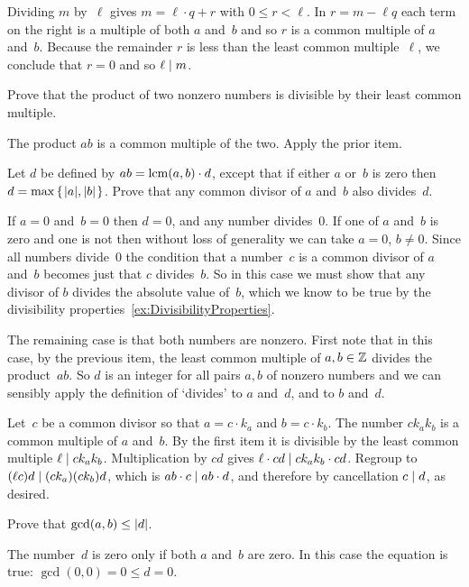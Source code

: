 \documentclass{test}  %
\begin{document}
\begin{euclidproof}
\begin{problem}
\begin{exes}
\begin{answer}
  Dividing $m$ by~$\ell$ gives 
  $m=\ell\cdot q+r$ with $0\leq r< \ell$.
  In $r=m-\ell q$ 
  each term on the right is a multiple
  of both $a$ and~$b$ and so 
  $r$ is a common multiple of $a$ and~$b$.
  Because the remainder $r$ is less than the least common multiple~$\ell$,
  we conclude that $r=0$ and so $\ell\mid m$.  
\end{answer}
\begin{exercise} 
  Prove that the product of two nonzero numbers is divisible by their 
  least common multiple.
\end{exercise}
\begin{answer}
  The product $ab$ is a common multiple of the two.
  Apply the prior item.
\end{answer}
\begin{exercise} 
  Let $d$ be defined by 
  $ab=\operatorname{lcm}(a,b)\cdot d$, except that if either $a$ or~$b$ is zero
  then $d=\max\mbox{$\{\hspace{0.1em}\lvert a\rvert,\lvert b\rvert\hspace{0.1em}\}$}$.
  Prove that any common divisor of $a$ and~$b$ also divides~$d$.
\end{exercise}
\begin{answer}
  If $a=0$ and~$b=0$ then $d=0$, and any number divides~$0$.
  If one of $a$ and~$b$ is zero and one is not then without loss of generality
  we can take $a=0$, $b\neq 0$.
  Since all numbers divide~$0$ the condition that a number~$c$ 
  is a common divisor of $a$ and~$b$
  becomes just that $c$ divides~$b$.
  So in this case we must show that any divisor of $b$ divides the 
  absolute value of~$b$, which we know to be true by the divisibility 
  properties~\ref{ex:DivisibilityProperties}.

  The remaining case is that both numbers are nonzero.
  First note that in this case,
  by the previous item, the least common multiple of $a,b\in\mathbb{Z}$ divides
  the product~$ab$.
  So $d$ is an integer for all pairs $a,b$ of nonzero numbers
  and we can sensibly apply the definition of `divides' to
  $a$ and~$d$, and to $b$ and~$d$.
  
  Let~$c$ be a common divisor so that $a=c\cdot k_a$ and $b=c\cdot k_b$.
  The number $ck_ak_b$ is a common multiple of $a$ and~$b$. 
  By the first item it is divisible by the least common multiple  
  $\ell\mid ck_ak_b$.
  Multiplication by $cd$ gives $\ell\cdot cd\mid ck_ak_b\cdot cd$.
  Regroup to $(\ell c)d\mid (ck_a)(ck_b)d$, which is
  $ab\cdot c\mid ab\cdot d$, and therefore by cancellation $c\mid d$,
  as desired.  
\end{answer}
\begin{exercise} 
  Prove that $\gcd(a,b)\leq\lvert d\rvert$.
\end{exercise}
\begin{answer}
  The number~$d$ is zero only if both $a$ and~$b$ are
  zero.
  In this case the equation is true: $\gcd(0,0)=0\leq d=0$.


\end{answer}
\end{exes}
\end{problem}
\end{euclidproof}
\end{document}
